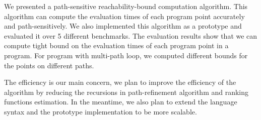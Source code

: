 We presented a path-sensitive reachability-bound computation algorithm.
This algorithm can compute the evaluation times of each program point accurately and path-sensitively.
We also implemented this algorithm as a prototype and evaluated it over 5 different benchmarks.
The evaluation results show that we can compute tight bound on the evaluation times of each program point in a program. For program with multi-path loop, we computed different bounds for the points on different paths.

The efficiency is our main concern, we plan to improve the efficiency of the algorithm by reducing the recursions in path-refinement algorithm and ranking functions estimation.
In the meantime, we also plan to extend the language syntax and the prototype implementation to be more scalable.
